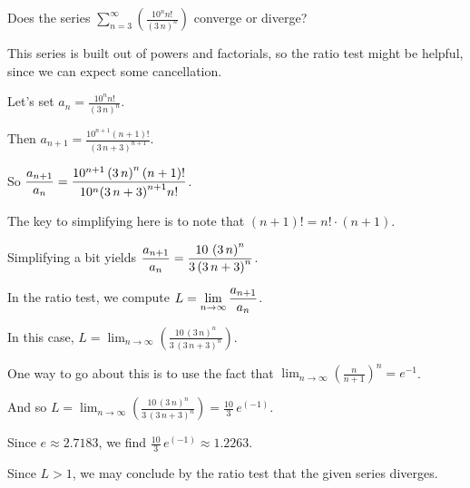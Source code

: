 \documentclass{ximera}
\begin{document}
\begin{question}
  Does the series \(\displaystyle\sum_{n=3}^\infty \left( \displaystyle\frac{10^{n} n!}{\left(3 \, n\right)^{n} } \right)\) converge or diverge?

  \begin{solution}
    \begin{hint}
      This series is built out of powers and factorials, so the ratio test might be helpful, since we can expect some cancellation.
    \end{hint}
    \begin{hint}
      Let's set \(a_n = \displaystyle\frac{10^{n} n!}{\left(3 \, n\right)^{n} }\).
    \end{hint}
    \begin{hint}
      Then \(a_{n+1} = \displaystyle\frac{10^{n + 1} \left(n + 1\right)!}{ {\left(3 \, n + 3\right)}^{n + 1} }\).
    \end{hint}
    \begin{hint}
      So \(\displaystyle\displaystyle\frac{a_{n+1} }{a_n} = \displaystyle\frac{10^{n + 1} \left(3 \, n\right)^{n} \left(n + 1\right)!}{10^{n} {\left(3 \, n + 3\right)}^{n + 1} n!}\).
    \end{hint}
    \begin{hint}
      The key to simplifying here is to note that \(\left(n + 1\right)! = n! \cdot (n + 1)\).
    \end{hint}
    \begin{hint}
      Simplifying a bit yields \(\displaystyle\displaystyle\frac{a_{n+1} }{a_n} = \displaystyle\frac{10 \, \left(3 \, n\right)^{n} }{3 \, {\left(3 \, n + 3\right)}^{n} }\).
    \end{hint}
    \begin{hint}
      In the ratio test, we compute \(L = \displaystyle\lim_{n \to \infty} \displaystyle\displaystyle\frac{a_{n+1} }{a_n}\).
    \end{hint}
    \begin{hint}
      In this case, \(L = \displaystyle\lim_{n \to \infty} \left( \displaystyle\frac{10 \, \left(3 \, n\right)^{n} }{3 \, {\left(3 \, n + 3\right)}^{n} } \right)\).
    \end{hint}
    \begin{hint}
      One way to go about this is to use the fact that \(\displaystyle\lim_{n \to \infty} \left( \displaystyle\frac{n}{n + 1} \right)^{n} = e^{-1}\).
    \end{hint}
    \begin{hint}
      And so \(L = \displaystyle\lim_{n \to \infty} \left( \displaystyle\frac{10 \, \left(3 \, n\right)^{n} }{3 \, {\left(3 \, n + 3\right)}^{n} } \right) = \displaystyle\frac{10}{3} \, e^{\left(-1\right)}\).
    \end{hint}
    \begin{hint}
      Since \(e \approx 2.7183\), we find \(\displaystyle\frac{10}{3} \, e^{\left(-1\right)} \approx 1.2263\).
    \end{hint}
    \begin{hint}
      Since \(L > 1\), we may conclude by the ratio test that the given series diverges.
    \end{hint}


\end{solution}
\end{question}
\end{document}
